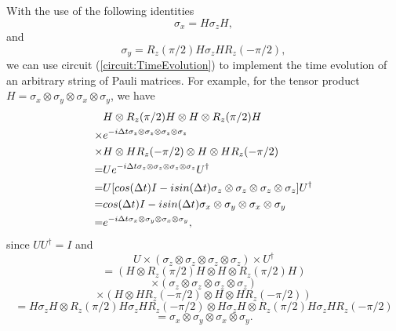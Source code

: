 With the use of the following identities
\begin{equation}
    \label{eq:XintermsofZ}
    \sigma_x = H\sigma_zH,
\end{equation}
and
\begin{equation}
    \label{eq:YintermsofZ}
    \sigma_y = R_z(\pi/2)H\sigma_z H R_z(-\pi/2),
\end{equation}
we can use circuit (\ref{circuit:TimeEvolution}) to implement the time evolution of an arbitrary string of Pauli matrices. For example, for the tensor product $H = \sigma_x \otimes \sigma_y \otimes \sigma_x \otimes \sigma_y$, we have
\begin{align}
    \label{eq:TwobodyHamilExample}
    &H \otimes R_z(\pi/2)H \otimes H \otimes R_z(\pi/2)H \notag \\
    \times  & e^{-i\Delta t \sigma_z\otimes \sigma_z \otimes \sigma_z \otimes \sigma_z}  \notag \\
    \times & H \otimes HR_z(-\pi/2) \otimes H \otimes HR_z(-\pi/2) \notag \\
    = & U e^{-i\Delta t \sigma_z\otimes \sigma_z \otimes \sigma_z \otimes \sigma_z} U^\dagger \notag \\
    =& U [cos(\Delta t)I - isin(\Delta t) \sigma_z\otimes \sigma_z \otimes \sigma_z \otimes \sigma_z]U^\dagger \notag \\
    =& cos(\Delta t)I - isin(\Delta t) \sigma_x \otimes \sigma_y \otimes \sigma_x \otimes \sigma_y \notag \\
    =& e^{-i\Delta t \sigma_x \otimes \sigma_y \otimes \sigma_x \otimes \sigma_y}, \notag
\end{align}
since $U U^\dagger = I$ and
$$ U \times (\sigma_z\otimes \sigma_z \otimes \sigma_z \otimes \sigma_z) \times U^\dagger $$
$$=(H \otimes R_z(\pi/2)H \otimes H \otimes R_z(\pi/2)H)$$
$$\times (\sigma_z\otimes \sigma_z \otimes \sigma_z \otimes \sigma_z)$$ $$\times (H \otimes HR_z(-\pi/2) \otimes H \otimes HR_z(-\pi/2))$$
$$= H\sigma_z H \otimes R_z(\pi/2)H\sigma_z H R_z(-\pi/2) \otimes H \sigma_z H \otimes R_z(\pi/2) H \sigma_z H R_z(-\pi/2)$$
$$ = \sigma_x \otimes \sigma_y \otimes \sigma_x \otimes \sigma_y. $$

